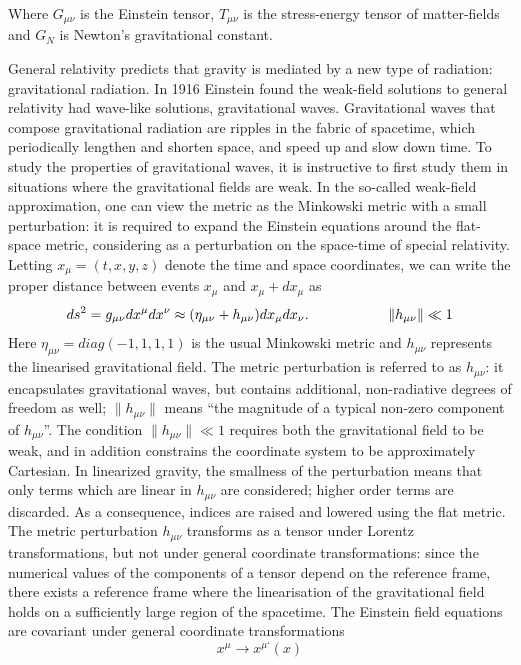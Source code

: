 \documentclass[binding=0.6cm, LaM]{sapthesis}
\begin{document}
Where $G_{\mu\nu} $ is the Einstein tensor, $T_{\mu\nu} $ is the stress-energy tensor of matter-fields and $ G_{N}$ is Newton’s gravitational constant. 

General relativity predicts that gravity is mediated by a new type of radiation: gravitational radiation. 
In 1916 Einstein found the weak-field solutions to general relativity had wave-like solutions, gravitational waves. 
Gravitational waves that compose gravitational radiation are ripples in the fabric of spacetime, which periodically lengthen and shorten space, and speed up and slow down time. 
 To study the properties of gravitational waves, it is instructive to first study them in situations where the gravitational fields are weak. 
In the so-called weak-field approximation, one can view the metric as the Minkowski metric with a small perturbation: it is required to expand the Einstein equations around the flat-space metric, 
considering as a perturbation on the space-time of special relativity. 
Letting $ x_\mu = (t, x, y, z)$ denote the time and space coordinates, we can write the proper distance between events $x_{\mu}$ and
$x_{\mu} + dx_{\mu}$ as
\[
ds^2 = g_{\mu\nu}dx^{\mu}dx^{\nu} \approx (\eta_{\mu\nu} + h_{\mu\nu})dx_{\mu}dx_{\nu}. \hspace*{2cm}\|h_{\mu\nu}\|\ll 1
\]
Here $\eta_{\mu\nu} = diag(-1,1,1,1)$ is the usual Minkowski metric and
 $h_{\mu\nu}$ represents the linearised gravitational field.
The metric perturbation is referred to as  $h_{\mu\nu}$: it encapsulates gravitational waves, but contains additional, non-radiative degrees of freedom as well; $\|h_{\mu\nu}\|$ means 
“the magnitude of a typical non-zero component of $h_{\mu\nu}$”. The condition $\|h_{\mu\nu}\|\ll 1$ requires both the gravitational field to be weak, and in addition constrains the 
coordinate system to be approximately Cartesian.  In linearized gravity, the smallness of the perturbation means that only terms which are linear in $h_{\mu\nu}$ are considered; 
higher order terms are discarded. As a consequence, indices are raised and lowered using the flat metric. 
The metric perturbation $h_{\mu\nu}$ transforms as a tensor under Lorentz transformations, but not under general coordinate transformations: since the numerical values of the components 
of a tensor depend on the reference frame, there exists a reference frame where the linearisation of the gravitational field holds on a sufficiently large region of the spacetime. 
The Einstein field equations are covariant under general coordinate transformations
\begin{equation}
x^{\mu} \rightarrow x^{\mu ‘}(x)
\end{equation}
\end{document}
